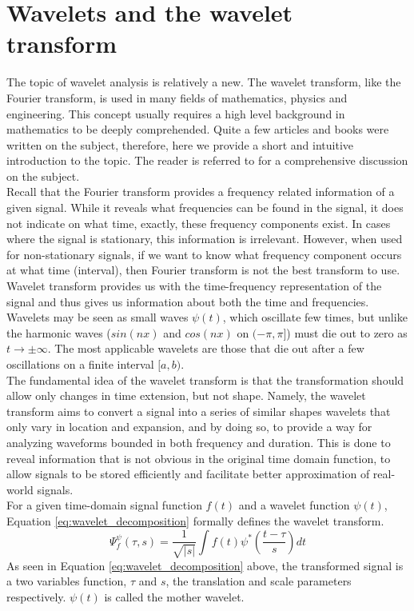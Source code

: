 \documentclass[12pt,english]{report}
\begin{document}
\chapter{Wavelets and the wavelet transform}

The topic of wavelet analysis is relatively a new. The wavelet transform, like the Fourier transform, is used in many fields of mathematics, physics and engineering. This concept usually requires a high level background in mathematics to be deeply comprehended. Quite a few articles and books were written on the subject, therefore, here we provide a short and intuitive introduction to the topic. The reader is referred to \cite{meyer1992wavelets} for a comprehensive discussion on the subject.\\ 

Recall that the Fourier transform provides a frequency related information of a given signal. While it reveals what frequencies can be found in the signal, it does not indicate on what time, exactly, these frequency components exist. In cases where the signal is stationary, this information is irrelevant. However, when used for non-stationary signals, if we want to know what frequency component occurs at what time (interval), then Fourier transform is not the best transform to use. Wavelet transform provides us with the time-frequency representation of the signal and thus gives us information about both the time and frequencies.\\

Wavelets may be seen as small waves $\psi(t)$, which oscillate few times, but unlike the harmonic waves ($sin(nx)$ and $cos(nx)$ on $(-\pi,\pi]$) must die out to zero as $t \rightarrow \pm\infty$. The most applicable wavelets are those that die out after a few oscillations on a finite interval $[a,b)$. \\

The fundamental idea of the wavelet transform is that the transformation should allow only changes in time extension, but not shape. Namely, the wavelet transform aims to convert a signal into a series of similar shapes wavelets that only vary in location and expansion, and by doing so, to provide a way for analyzing waveforms bounded in both frequency and duration. This is done to reveal information that is not obvious in the original time domain function, to allow signals to be stored efficiently and facilitate better approximation of real-world signals. \\

For a given time-domain signal function $f(t)$ and a wavelet function $\psi(t)$, Equation \ref{eq:wavelet_decomposition} formally defines the wavelet transform.
\begin{equation}
\Psi^{\psi}_{f}(\tau, s)=\frac{1}{\sqrt{|s|}}\int{f(t)\psi^*(\frac{t-\tau}{s})dt}
\label{eq:wavelet_decomposition}
\end{equation}
As seen in Equation \ref{eq:wavelet_decomposition} above, the transformed signal is a two variables function, $\tau$ and $s$, the translation and scale parameters respectively. $\psi(t)$ is called the mother wavelet.\\
\end{document}
